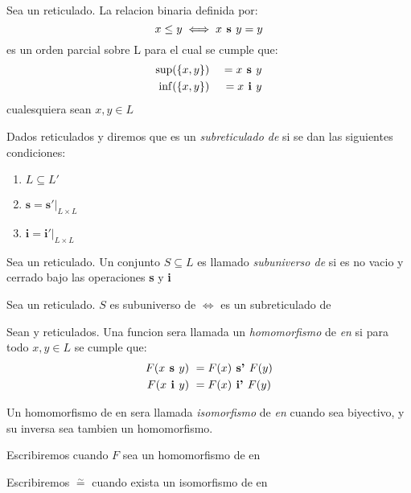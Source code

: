 \begin{theorem}
  Sea \reticulAlg un reticulado. La relacion binaria definida por:
  $$
  x \leq y \iff x\textbf{ s }y = y
  $$
  es un orden parcial sobre L para el cual se cumple que:
  \begin{alignat*}{2}
    \sup&(\{x, y\}) &\ = x\textbf{ s }y\\
    \inf&(\{x, y\}) &\ = x\textbf{ i }y
  \end{alignat*}
  cualesquiera sean $x, y \in L$
\end{theorem}
\begin{definition}
  Dados reticulados \reticulAlg y  diremos que \reticulAlg
  es un \emph{subreticulado de}  si se dan las siguientes condiciones:
  \begin{enumerate}
    \item $L \subseteq L'$
    \item $\textbf{s} = \textbf{s}'\vert_{L\times L}$
    \item $\textbf{i} = \textbf{i}'\vert_{L\times L}$
  \end{enumerate}
\end{definition}
\begin{definition}
  Sea \reticulAlg un reticulado. Un conjunto $S \subseteq L$ es llamado \emph{subuniverso de} \reticulAlg
  si es no vacio y cerrado bajo las operaciones \textbf{s} y \textbf{i}
\end{definition}
\begin{remark}
  Sea \reticulAlg un reticulado. $S$ es subuniverso de \reticulAlg $\iff$ 
  es un subreticulado de \reticulAlg
\end{remark}
\begin{definition}
  Sean \reticulAlg y  reticulados. Una funcion 
  sera llamada un \emph{homomorfismo} de \reticulAlg \emph{en}  si
  para todo $x, y \in L$ se cumple que:
  \begin{alignat*}{2}
    F(x\textbf{ s }y) &\ = F(x)\textbf{ s' }F(y)\\
    F(x\textbf{ i }y) &\ = F(x)\textbf{ i' }F(y)\\    
  \end{alignat*}

  Un homomorfismo de \reticulAlg en  sera llamada \emph{isomorfismo}
  de \reticulAlg \emph{en}  cuando sea biyectivo, y su inversa
  sea tambien un homomorfismo.

  Escribiremos  cuando $F$ sea un homomorfismo
  de \reticulAlg en 

  Escribiremos \reticulAlg $\overset{\sim}{=}$  cuando exista
  un isomorfismo de \reticulAlg en 
\end{definition}

